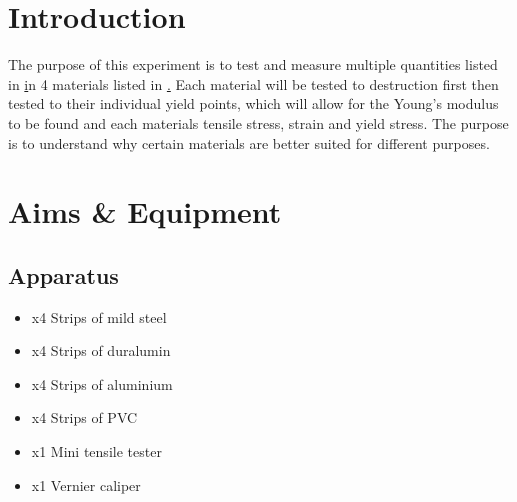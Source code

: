 \documentclass[11pt]{article}
\begin{document}
\begin{multicols}{2}

\section{Introduction}
\label{Introduction Section}

The purpose of this experiment is to test and measure multiple quantities listed in \href{Data Collected SubSection} in 4 materials listed in \href{Apparatus SubSection}. Each material will be tested to destruction first then tested to their individual yield points, which will allow for the Young's modulus to be found and each materials tensile stress, strain and yield stress. The purpose is to understand why certain materials are better suited for different purposes.


\section{Aims \& Equipment}
\label{AimsEquipmentSection}


\subsection{Apparatus}
\label{Apparatus SubSection}

\begin{itemize}
    \item{x4 Strips of mild steel}
    \item{x4 Strips of duralumin}
    \item{x4 Strips of aluminium}
    \item{x4 Strips of PVC}
    \item{x1 Mini tensile tester}
    \item{x1 Vernier caliper}
\end{itemize}



\end{multicols}
\end{document}
